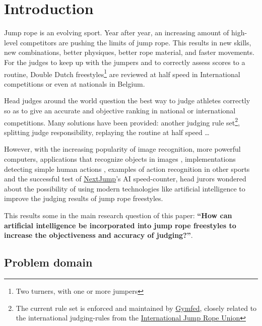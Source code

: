 
\section{Introduction}
\label{proposal-sec:proposal-introduction}

Jump rope is an evolving sport.
Year after year, an increasing amount of high-level competitors are pushing the limits of jump rope.
This results in new skills, new combinations, better physiques, better rope material, and faster movements. For the judges to keep up with the jumpers and to correctly assess scores to a routine, Double Dutch freestyles\footnote{Two turners, with one or more jumpers} are reviewed at half speed in International competitions or even at nationals in Belgium.

Head judges around the world question the best way to judge athletes correctly so as to give an accurate and objective ranking in national or international competitions.
Many solutions have been provided: another judging rule set\footnote{The current rule set is enforced and maintained by \href{https://www.gymfed.be/}{Gymfed}, closely related to the international judging-rules from the \href{https://ijru.sport/}{International Jump Rope Union}}, splitting judge responsibility, replaying the routine at half speed \dots

However, with the increasing popularity of image recognition, more powerful computers, applications that recognize objects in images \autocite{Singh_Gill_2022}, implementations detecting simple human actions \autocite{LUQMAN_2022}, examples of action recognition in other sports \autocite{Yin_2024} and the successful test of \href{https://nextjump.app/}{NextJump}'s AI speed-counter, head jurors wondered about the possibility of using modern technologies like artificial intelligence to improve the judging results of jump rope freestyles.

This results some in the main research question of this paper: \textbf{``How can artificial intelligence be incorporated into jump rope freestyles to increase the objectiveness and accuracy of judging?''}.

\subsection{Problem domain}
\label{proposal-subsec:proposal-intro-problem-domain}

